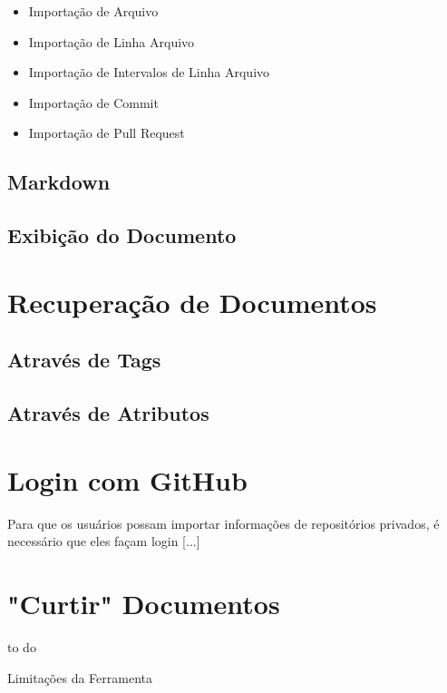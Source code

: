 \begin{itemize}
  \item Importação de Arquivo
  \item Importação de Linha Arquivo
  \item Importação de Intervalos de Linha Arquivo
  \item Importação de Commit
  \item Importação de Pull Request
\end{itemize}

\subsection{Markdown}
\subsection{Exibição do Documento}

\section{Recuperação de Documentos}

\subsection{Através de Tags}
\subsection{Através de Atributos}

\section{Login com GitHub}

Para que os usuários possam importar informações de repositórios privados, é necessário que eles façam login [...]

\section{"Curtir" Documentos}

to do

Limitações da Ferramenta

